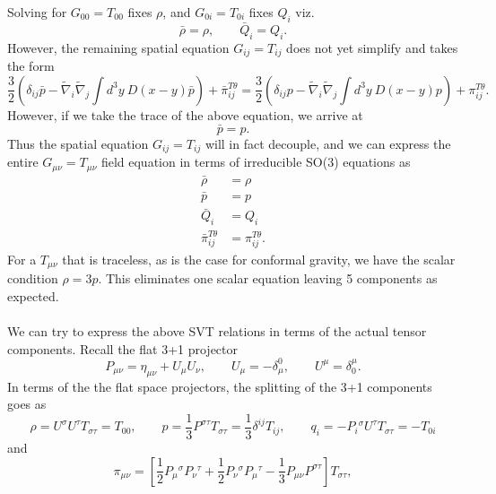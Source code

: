 \documentclass[10pt,letterpaper]{article}
\numberwithin{equation}{subsection}
\begin{document}
Solving for $G_{00} = T_{00}$ fixes $\rho$, and $G_{0i} = T_{0i}$ fixes $Q_i$ viz.
\begin{equation}
\bar\rho = \rho,\qquad
\bar Q_i = Q_i. 
\end{equation}
However, the remaining spatial equation $G_{ij} = T_{ij}$ does not yet simplify and takes the form
\begin{equation}
 \frac32 \left( \delta_{ij}\bar p - \tilde\nabla_i \tilde\nabla_j \int d^3y\ D(x-y) \bar p\right) + \bar\pi_{ij}^{T\theta} = 
\frac32 \left( \delta_{ij} p - \tilde\nabla_i \tilde\nabla_j \int d^3y\ D(x-y) p \right) + \pi_{ij}^{T\theta}. 
\end{equation}
However, if we take the trace of the above equation, we arrive at
\begin{equation}
\bar p = p.
\end{equation}
Thus the spatial equation $G_{ij} = T_{ij}$ will in fact decouple, and we can express the entire $G_{\mu\nu} = T_{\mu\nu}$ field equation in terms of irreducible SO(3) equations as
\begin{align}
\bar \rho& = \rho
\nonumber\\
\bar p &= p
\nonumber\\
\bar Q_i &= Q_i
\nonumber\\
\bar \pi_{ij}^{T\theta} &= \pi_{ij}^{T\theta}.
\end{align}
For a $T_{\mu\nu}$ that is traceless, as is the case for conformal gravity, we have the scalar condition $\rho = 3p$. This eliminates one scalar equation leaving 5 components as expected. 
\\ \\
We can try to express the above SVT relations in terms of the actual tensor components. Recall the flat 3+1 projector
\begin{equation}
P_{\mu\nu} = \eta_{\mu\nu}+U_{\mu}U_{\nu},\qquad U_{\mu} = -\delta^0_\mu,\qquad U^\mu = \delta^\mu_0.
\end{equation}
In terms of the the flat space projectors, the splitting of the 3+1 components goes as
\begin{equation}
\rho = U^\sigma U^\tau T_{\sigma\tau} = T_{00} ,\qquad p = \frac13 P^{\sigma\tau}T_{\sigma\tau}=\frac13 \delta^{ij}T_{ij},\qquad q_{i} = -P_i{}^\sigma U^\tau T_{\sigma\tau} = -T_{0i}
\end{equation}
and 
\begin{equation}
\pi_{\mu\nu} = \left[ \frac12 P_\mu{}^\sigma P_\nu{}^\tau + \frac12 P_\nu{}^\sigma P_\mu{}^\tau - \frac13 P_{\mu\nu}P^{\sigma\tau}\right]T_{\sigma\tau},
\end{equation}
\end{document}
